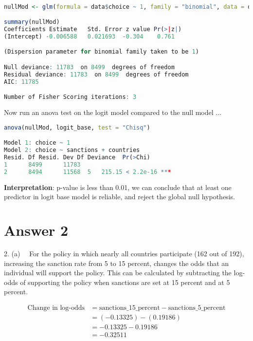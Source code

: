 \documentclass[12pt,letterpaper]{article}
\begin{document}
\begin{lstlisting}[language=R]

nullMod <- glm(formula = data$choice ~ 1, family = "binomial", data = data)

summary(nullMod)
Coefficients Estimate 	Std. Error z value Pr(>|z|)
(Intercept) -0.006588   0.021693  -0.304    0.761

(Dispersion parameter for binomial family taken to be 1)

Null deviance: 11783  on 8499  degrees of freedom
Residual deviance: 11783  on 8499  degrees of freedom
AIC: 11785

Number of Fisher Scoring iterations: 3

 \end{lstlisting}
 
\noindent Now run an anova test on the logit model compared to the null model  ...

\begin{lstlisting}[language=R]
anova(nullMod, logit_base, test = "Chisq")

Model 1: choice ~ 1
Model 2: choice ~ sanctions + countries
Resid. Df Resid. Dev Df Deviance  Pr(>Chi)    
1      8499      11783                          
2      8494      11568  5   215.15 < 2.2e-16 *** 

 \end{lstlisting}

\noindent \textbf{Interpretation}: p-value is less than 0.01, we can conclude that at least one predictor in logit base model is reliable, and reject the global null hypothesis.



\newpage

\section*{Answer 2} 
\vspace{.25cm}




2. (a) \
\
For the policy in which nearly all countries participate (162 out of 192), increasing the sanction rate from 5 to 15 percent, changes the odds that an individual will support the policy. This can be calculated by subtracting the log-odds of supporting the policy when sanctions are set at 15 percent and at 5 percent.

\begin{align*}
	\text{Change in log-odds} &= \text{sanctions\_15\_percent} - \text{sanctions\_5\_percent} \\
	&= (-0.13325) - (0.19186) \\
	&= -0.13325 - 0.19186 \\
	&= -0.32511
\end{align*}
\end{document}

